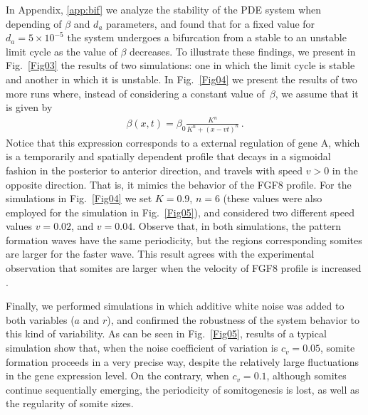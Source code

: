 \documentclass[11pt]{article}
\begin{document}
	In Appendix, \ref{app:bif} we analyze the stability of the PDE system when 
	depending of $\beta$ and $d_a$ parameters, and found that for a fixed value 
	for $d_a=5\times10^{-5}$ the system undergoes a bifurcation	from a stable to 
	an unstable limit cycle as the value of $\beta$ decreases. To illustrate these 
	findings, we present in Fig.~\ref{Fig03} the results of two
	simulations: one in which the limit cycle is stable and another in which it is
	unstable. In Fig.~\ref{Fig04} we present the results of two more runs where,
	instead of considering a constant value of~$\beta$, we assume that it is given
	by 
	\begin{gather}\label{eqbeta}
	\beta(x, t) = \beta_0 \frac{K^n}{K^n + (x - v t)^n}\,.
	\end{gather}
	Notice that this expression corresponds to a external regulation of gene A, which is a temporarily and spatially dependent profile that decays in a sigmoidal fashion in the posterior to anterior direction, and travels with speed
	$v>0$ in the opposite direction. That is, it mimics the behavior of the FGF8
	profile. For the simulations in Fig.~\ref{Fig04} we set $K =0.9 $, $n = 6 $
	(these values were also employed for the simulation in Fig.~\ref{Fig05}), and
	considered two different speed values $v = 0.02 $, and $v = 0.04$. Observe that, in
	both simulations, the pattern formation waves have the same periodicity, but the
	regions corresponding somites are larger for the faster wave. This result agrees
	with the experimental observation that somites are	larger when the velocity of 
	FGF8 profile is increased \citep{Sawada2001}. 
	
	Finally, we performed simulations in which additive white noise was added to
	both variables ($a$ and $r$), and confirmed the robustness of the system
	behavior to this kind of variability. As can be seen in Fig.~\ref{Fig05},
	results of a typical simulation show that, when the noise coefficient of
	variation is $c_v = 0.05$, somite formation proceeds in a very precise way,
	despite the relatively large fluctuations in the gene expression level. On the
	contrary, when $c_v = 0.1$, although somites continue sequentially emerging, the
	periodicity of somitogenesis is lost, as well as the regularity of somite sizes.
	
\end{document}

